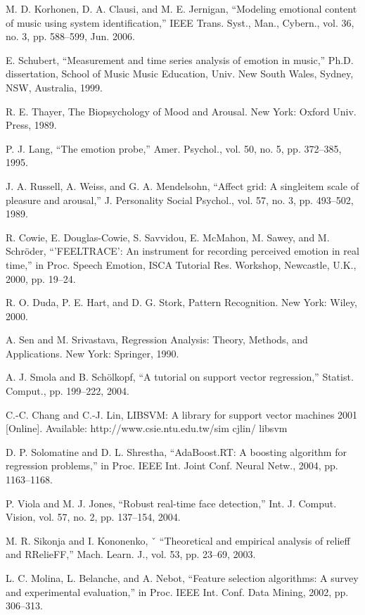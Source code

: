 \documentclass[journal, twoside]{IEEEtran}
\begin{document}
\begin{thebibliography}{1}
M. D. Korhonen, D. A. Clausi, and M. E. Jernigan, “Modeling emotional content of music using system identification,” IEEE Trans. Syst.,
Man., Cybern., vol. 36, no. 3, pp. 588–599, Jun. 2006.

E. Schubert, “Measurement and time series analysis of emotion in
music,” Ph.D. dissertation, School of Music Music Education, Univ.
New South Wales, Sydney, NSW, Australia, 1999.


R. E. Thayer, The Biopsychology of Mood and Arousal. New York:
Oxford Univ. Press, 1989.


P. J. Lang, “The emotion probe,” Amer. Psychol., vol. 50, no. 5, pp.
372–385, 1995.


J. A. Russell, A. Weiss, and G. A. Mendelsohn, “Affect grid: A singleitem scale of pleasure and arousal,” J. Personality Social Psychol., vol.
57, no. 3, pp. 493–502, 1989.


R. Cowie, E. Douglas-Cowie, S. Savvidou, E. McMahon, M. Sawey,
and M. Schröder, “’FEELTRACE’: An instrument for recording perceived emotion in real time,” in Proc. Speech Emotion, ISCA Tutorial
Res. Workshop, Newcastle, U.K., 2000, pp. 19–24.


R. O. Duda, P. E. Hart, and D. G. Stork, Pattern Recognition. New
York: Wiley, 2000.


A. Sen and M. Srivastava, Regression Analysis: Theory, Methods, and
Applications. New York: Springer, 1990.


A. J. Smola and B. Schölkopf, “A tutorial on support vector regression,”
Statist. Comput., pp. 199–222, 2004.


 C.-C. Chang and C.-J. Lin, LIBSVM: A library for support vector machines 2001 [Online]. Available: http://www.csie.ntu.edu.tw/sim cjlin/
libsvm


D. P. Solomatine and D. L. Shrestha, “AdaBoost.RT: A boosting algorithm for regression problems,” in Proc. IEEE Int. Joint Conf. Neural
Netw., 2004, pp. 1163–1168.


P. Viola and M. J. Jones, “Robust real-time face detection,” Int. J.
Comput. Vision, vol. 57, no. 2, pp. 137–154, 2004.


M. R. Sikonja and I. Kononenko, ˇ “Theoretical and empirical analysis
of relieff and RRelieFF,” Mach. Learn. J., vol. 53, pp. 23–69, 2003.


L. C. Molina, L. Belanche, and A. Nebot, “Feature selection algorithms: A survey and experimental evaluation,” in Proc. IEEE Int. Conf.
Data Mining, 2002, pp. 306–313.



\end{thebibliography}
\end{document}
